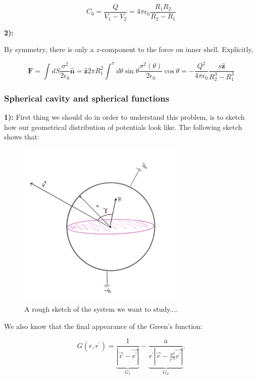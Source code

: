 \begin{equation}
	C_{0}=\frac{Q}{V_{1}-V_{2}}=4 \pi \epsilon_{0} \frac{R_{1} R_{2}}{R_{2}-R_{1}}
\end{equation}
	
\textbf{2):}

By symmetry, there is only a $z$-component to the force on inner shell. Explicitly,

\begin{equation}
	\mathbf{F}=\int d S \frac{\sigma^{2}}{2 \epsilon_{0}} \hat{\mathbf{n}}=\hat{\mathbf{z}} 2 \pi R_{1}^{2} \int^{\pi} d \theta \sin \theta \frac{\sigma^{2}(\theta)}{2 \epsilon_{0}} \cos \theta=-\frac{Q^{2}}{4 \pi \epsilon_{0}} \frac{s \hat{\mathbf{z}}}{R_{2}^{3}-R_{1}^{3}}
\end{equation}

\subsubsection{Spherical cavity and spherical functions}\label{Spherical cavity and spherical functions}

\textbf{1):}
First thing we should do in order to understand this problem, is to sketch how our geometrical distribution of potentials look like. The following sketch shows that:
	
\begin{figure}[h]
	\includegraphics[width=8cm]{figures/SphericalCavity.png}
	\centering
	\caption{A rough sketch of the system we want to study....}
\end{figure}

We also know that the final appearance of the Green's function:

\begin{equation} \label{twopropagators}
	G\left(r, r^{\prime}\right)=\underbrace{\frac{1}{\left|\vec{r}-\vec{r^{\prime}}\right|}}_{G_{1}}-\underbrace{\frac{a}{r^{\prime}\left|\vec{r}-\frac{a^{2}}{r^{\prime 2}} \vec{r^{\prime}}\right|}}_{G_{2}}.
\end{equation}

